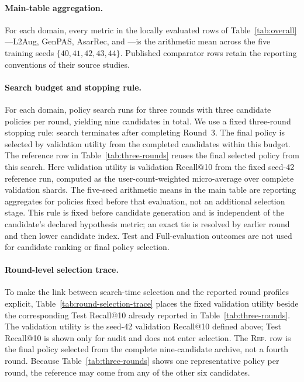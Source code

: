 \paragraph{Main-table aggregation.}
For each domain, every metric in the locally evaluated rows of Table~\ref{tab:overall}---L2Aug, GenPAS, AsarRec, and \method{}---is the arithmetic mean across the five training seeds $\{40,41,42,43,44\}$. Published comparator rows retain the reporting conventions of their source studies.

\paragraph{Search budget and stopping rule.}
For each domain, policy search runs for three rounds with three candidate policies per round, yielding nine candidates in total. We use a fixed three-round stopping rule: search terminates after completing Round~3. The final policy is selected by validation utility from the completed candidates within this budget. The reference row in Table~\ref{tab:three-rounds} reuses the final selected policy from this search.
Here validation utility is validation Recall@10 from the fixed seed-42 reference run, computed as the user-count-weighted micro-average over complete validation shards. The five-seed arithmetic means in the main table are reporting aggregates for policies fixed before that evaluation, not an additional selection stage. This rule is fixed before candidate generation and is independent of the candidate's declared hypothesis metric; an exact tie is resolved by earlier round and then lower candidate index. Test and Full-evaluation outcomes are not used for candidate ranking or final policy selection.

\paragraph{Round-level selection trace.}
To make the link between search-time selection and the reported round profiles explicit, Table~\ref{tab:round-selection-trace} places the fixed validation utility beside the corresponding Test Recall@10 already reported in Table~\ref{tab:three-rounds}. The validation utility is the seed-42 validation Recall@10 defined above; Test Recall@10 is shown only for audit and does not enter selection. The \textsc{Ref.} row is the final policy selected from the complete nine-candidate archive, not a fourth round. Because Table~\ref{tab:three-rounds} shows one representative policy per round, the reference may come from any of the other six candidates.

